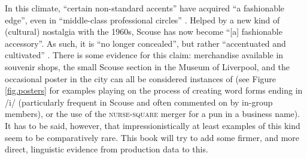 In this climate, ``certain non-standard accents'' have acquired ``a fashionable edge'', even in ``middle-class professional circles'' \parencite[58]{belchem2006d}.
Helped by a new kind of (cultural) nostalgia with the 1960s, Scouse has now become ``[a] fashionable accessory''.
As such, it is ``no longer concealed'', but rather ``accentuated and cultivated'' \citep[58]{belchem2006d}.
There is some evidence for this claim: merchandise available in souvenir shops, the small Scouse section in the Museum of Liverpool, and the occasional poster in the city can all be considered instances of  (see Figure \ref{fig.posters} for examples playing on the process of creating word forms ending in /i/ (particularly frequent in Scouse and often commented on by in-group members), or the use of the \textsc{nurse}-\textsc{square} merger for a pun in a business name).
It has to be said, however, that impressionistically at least examples of this kind seem to be comparatively rare.
This book will try to add some firmer, and more direct, linguistic evidence from production data to this.

